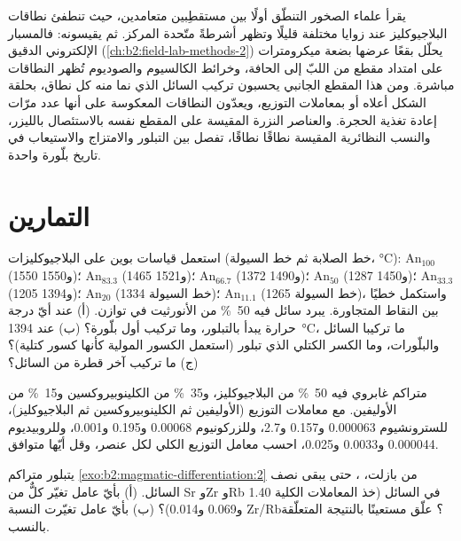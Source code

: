 \begin{inthelab}
يقرأ علماء الصخور التنطّق أولًا بين مستقطِبين متعامدين، حيث تنطفئ نطاقات
البلاجيوكليز عند زوايا مختلفة قليلًا وتظهر أشرطةً متّحدة المركز.
ثم يقيسونه: فالمسبار الإلكتروني الدقيق (\cref{ch:b2:field-lab-methods-2})
يحلّل بقعًا عرضها بضعة ميكرومترات على امتداد مقطع من اللبّ إلى الحافة، وخرائط
الكالسيوم والصوديوم تُظهر النطاقات مباشرة. ومن هذا المقطع الجانبي يحسبون
تركيب السائل الذي نما منه كل نطاق، بحلقة الشكل أعلاه أو
بمعاملات التوزيع، ويعدّون النطاقات المعكوسة على أنها عدد مرّات
إعادة تغذية الحجرة. والعناصر النزرة المقيسة على المقطع نفسه بالاستئصال
بالليزر، والنسب النظائرية المقيسة نطاقًا نطاقًا، تفصل بين التبلور والامتزاج
والاستيعاب في تاريخ بلّورة واحدة.
\end{inthelab}

\section{التمارين}

\begin{exercise}[$\star$]\label{exo:b2:magmatic-differentiation:1}
استعمل قياسات بوين على البلاجيوكليزات (خط الصلابة ثم خط السيولة، \unit{\celsius}):
An$_{100}$ (1550 و1550)؛ An$_{83.3}$ (1465 و1521)؛ An$_{66.7}$ (1372 و1490)؛ An$_{50}$
(1287 و1450)؛ An$_{33.3}$ (1205 و1394)؛ An$_{20}$ (خط السيولة 1334)؛ An$_{11.1}$ (خط السيولة
1265)، واستكمل خطيًا بين النقاط المتجاورة. يبرد سائل فيه
\qty{50}{\percent} من الأنورثيت في توازن. (أ) عند أيّ درجة حرارة يبدأ
بالتبلور، وما تركيب أول بلّورة؟ (ب) عند
\qty{1394}{\celsius}، ما تركيبا السائل والبلّورات،
وما الكسر الكتلي الذي تبلور (استعمل الكسور المولية كأنها كسور
كتلية)؟ (ج) ما تركيب آخر قطرة من السائل؟
\end{exercise}

\begin{exercise}[$\star$]\label{exo:b2:magmatic-differentiation:2}
متراكم غابروي فيه \qty{50}{\percent} من البلاجيوكليز، و\qty{35}{\percent} من
الكلينوبيروكسين و\qty{15}{\percent} من الأوليفين. مع معاملات التوزيع
(الأوليفين ثم الكلينوبيروكسين ثم البلاجيوكليز)، للسترونشيوم 0.000063 و0.157 و2.7، وللزركونيوم 0.00068
و0.195 و0.001، وللروبيديوم 0.000044 و0.0033 و0.025، احسب معامل التوزيع
الكلي لكل عنصر، وقل أيّها متوافق.
\end{exercise}

\begin{exercise}[$\star$]\label{exo:b2:magmatic-differentiation:3}
يتبلور متراكم \cref{exo:b2:magmatic-differentiation:2} من بازلت، ،
حتى يبقى نصف السائل. (أ) بأيّ عامل تغيّر كلٌّ من Sr وZr وRb
في السائل (خذ المعاملات الكلية 1.40 و0.069 و0.014)؟ (ب) بأيّ عامل
تغيّرت النسبة Zr/Rb؟ علّق مستعينًا بالنتيجة المتعلّقة بالنسب.
\end{exercise}

